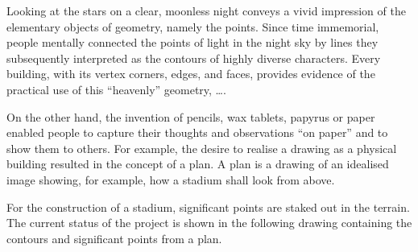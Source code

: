 \begin{MIntro}


Looking at the stars on a clear, moonless night conveys a vivid impression of the 
elementary objects of geometry, namely the points. Since time immemorial, people mentally 
connected the points of light in the night sky by lines they subsequently interpreted 
as the contours of highly diverse characters. Every building, with its vertex corners, 
edges, and faces, provides evidence of the practical use of this ``heavenly'' geometry, \ldots.

On the other hand, the invention of pencils, wax tablets, papyrus or paper enabled
people to capture their thoughts and observations ``on paper'' and to show them to
others. For example, the desire to realise a drawing as a physical building resulted in the 
concept of a plan. A plan is a drawing of an idealised image showing, for example, how 
a stadium shall look from above.

For the construction of a stadium, significant points are staked out in the terrain. The 
current status of the project is shown in the following drawing containing the contours and 
significant points from a plan. 



\end{MIntro}
